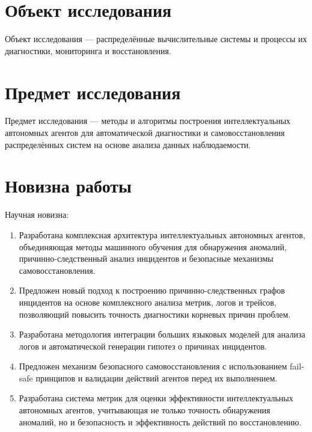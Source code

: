 \section*{Объект исследования}

Объект исследования --- распределённые вычислительные системы и процессы их диагностики, мониторинга и восстановления.

\section*{Предмет исследования}

Предмет исследования --- методы и алгоритмы построения интеллектуальных автономных агентов для автоматической диагностики и самовосстановления распределённых систем на основе анализа данных наблюдаемости.

\section*{Новизна работы}

Научная новизна:

\begin{enumerate}
    \item Разработана комплексная архитектура интеллектуальных автономных агентов, объединяющая методы машинного обучения для обнаружения аномалий, причинно-следственный анализ инцидентов и безопасные механизмы самовосстановления.

    \item Предложен новый подход к построению причинно-следственных графов инцидентов на основе комплексного анализа метрик, логов и трейсов, позволяющий повысить точность диагностики корневых причин проблем.

    \item Разработана методология интеграции больших языковых моделей для анализа логов и автоматической генерации гипотез о причинах инцидентов.

    \item Предложен механизм безопасного самовосстановления с использованием fail-safe принципов и валидации действий агентов перед их выполнением.

    \item Разработана система метрик для оценки эффективности интеллектуальных автономных агентов, учитывающая не только точность обнаружения аномалий, но и безопасность и эффективность действий по восстановлению.
\end{enumerate}

